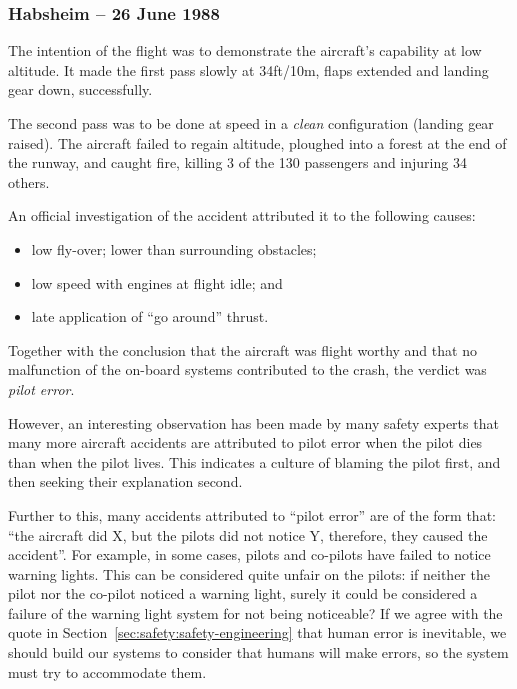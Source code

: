   \subsubsection*{Habsheim -- 26 June 1988}

  The intention of the flight was to demonstrate the aircraft's capability at low
  altitude.  It made the first pass slowly at 34ft/10m, flaps extended
  and landing gear down, successfully.  

 
  The second pass was to be done at speed in a \emph{clean}
  configuration (landing gear raised).  The aircraft failed to regain
  altitude, ploughed into a forest at the end of the runway, and
  caught fire, killing 3 of the 130 passengers and injuring 34 others.


  An official investigation of the accident attributed it to the following causes:
\begin{itemize}

\item low fly-over; lower than surrounding obstacles;

\item low speed with engines at flight idle; and

\item late application of ``go around'' thrust.

\end{itemize}

Together with the conclusion that the aircraft was flight worthy and
that no malfunction of the on-board systems contributed to the crash,
the verdict was \emph{pilot error}.

However, an interesting observation has been made by many safety experts that many more aircraft accidents are attributed to pilot error when the pilot dies than when the pilot lives. This indicates a culture of blaming the pilot first, and then seeking their explanation second.

Further to this, many accidents attributed to ``pilot error'' are of the form that: ``the aircraft did X, but the pilots did not notice Y, therefore, they caused the accident''. For example, in some cases, pilots and co-pilots have failed to notice warning lights. This can be considered quite unfair on the pilots: if neither the pilot nor the co-pilot noticed a warning light, surely it could be considered a failure of the warning light system for not being noticeable? If we agree with the quote in Section~\ref{sec:safety:safety-engineering} that human error is inevitable, we should build our systems to consider that humans will make errors, so the system must try to accommodate them.

